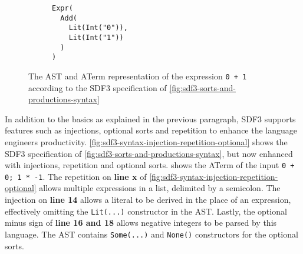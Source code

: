       \begin{figure}
        \begin{subfigure}[b]{0.5\textwidth}
          \centering
          \caption{\label{fig:example-AST-1-ast}}
        \end{subfigure}
        \begin{subfigure}[b]{0.5\textwidth}
          \begin{verbatim}
Expr(
  Add(
    Lit(Int("0")),
    Lit(Int("1"))
  )
)
          \end{verbatim}
          \caption{\label{fig:example-AST-1-aterm}}
        \end{subfigure}
        \caption{\label{fig:example-AST-1}The AST and ATerm representation of the expression \texttt{0 + 1} according to the SDF3 specification of \cref{fig:sdf3-sorts-and-productions-syntax}}
      \end{figure}

      In addition to the basics as explained in the previous paragraph, SDF3 supports features such as injections, optional sorts and repetition to enhance the language engineers productivity. \cref{fig:sdf3-syntax-injection-repetition-optional} shows the SDF3 specification of \cref{fig:sdf3-sorts-and-productions-syntax}, but now enhanced with injections, repetition and optional sorts.  shows the ATerm of the input \texttt{0 + 0; 1 * -1}. The repetition on \textbf{line x} of \cref{fig:sdf3-syntax-injection-repetition-optional} allows multiple expressions in a list, delimited by a semicolon. The injection on \textbf{line 14} allows a literal to be derived in the place of an expression, effectively omitting the \texttt{Lit(...)} constructor in the AST. Lastly, the optional minus sign of \textbf{line 16 and 18} allows negative integers to be parsed by this language. The AST contains \texttt{Some(...)} and \texttt{None()} constructors for the optional sorts.
        
